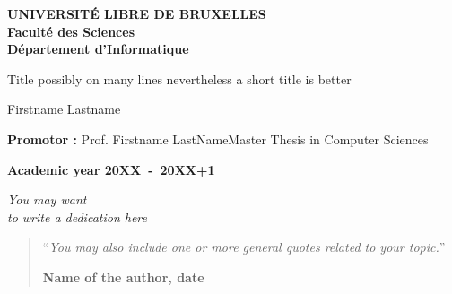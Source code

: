 \documentclass[11pt,a4paper,oneside]{book}
\begin{document}
\frontmatter
\begin{titlepage}
\begin{center}
\textbf{UNIVERSIT\'E LIBRE DE BRUXELLES}\\
\textbf{Facult\'e des Sciences}\\
\textbf{D\'epartement d'Informatique}
\vfill{}\vfill{}

{\Huge  Title \vspace*{.5cm}  \linebreak[4] possibly on many lines \vspace*{.5cm}  \linebreak[4]  nevertheless a short title is better}

{\Huge \par}
\begin{center}{\LARGE Firstname Lastname}\end{center}{\Huge \par}
\vfill{}\vfill{}
\begin{flushright}{\large \textbf{Promotor :} Prof. Firstname LastName}\hfill{}{\large Master Thesis in Computer Sciences}\\
{\large }\hfill{}{}\end{flushright}{\large\par}
\vfill{}\vfill{}\enlargethispage{3cm}
\textbf{Academic year 20XX~-~20XX+1}
\end{center}
\end{titlepage}
\newpage
\thispagestyle{empty} 
\null

\newenvironment{vcenterpage}
{\newpage\thispagestyle{empty} 
\vspace*{\fill}}
{\vspace*{\fill}\par\pagebreak}

\begin{vcenterpage}
\begin{flushright}
    \large\em\null\vskip1in 
    You may want\\
   to write a dedication here\vfill
  \end{flushright}
\end{vcenterpage}
\thispagestyle{empty}
\vspace*{5cm}

\begin{quotation}
\noindent ``\emph{You may also include one or more general quotes related to your topic.}''
\begin{flushright}\textbf{Name of the author, date}\end{flushright}
\end{quotation}
\end{document}
